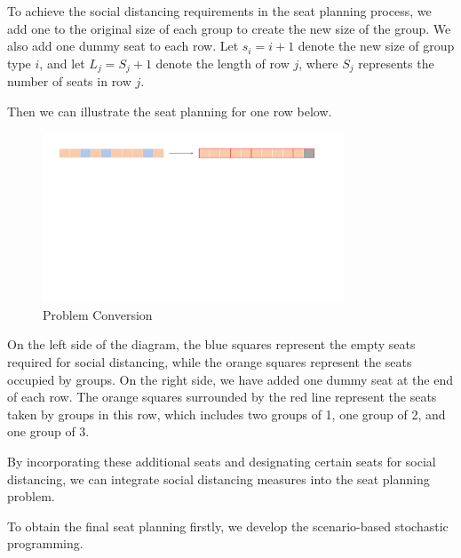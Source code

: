 To achieve the social distancing requirements in the seat planning process, we add one to the original size of each group to create the new size of the group. We also add one dummy seat to each row. Let $s_i = i + 1$ denote the new size of group type $i$, and let $L_j = S_j + 1$ denote the length of row $j$, where $S_j$ represents the number of seats in row $j$.


Then we can illustrate the seat planning for one row below. 

\begin{figure}[ht]
    \centering
    \includegraphics[width = 0.8\textwidth]{./Figures/dummy_seat.pdf}
    \caption{Problem Conversion}
\end{figure}


On the left side of the diagram, the blue squares represent the empty seats required for social distancing, while the orange squares represent the seats occupied by groups. On the right side, we have added one dummy seat at the end of each row. The orange squares surrounded by the red line represent the seats taken by groups in this row, which includes two groups of 1, one group of 2, and one group of 3.

By incorporating these additional seats and designating certain seats for social distancing, we can integrate social distancing measures into the seat planning problem.

To obtain the final seat planning firstly, we develop the scenario-based stochastic programming.







